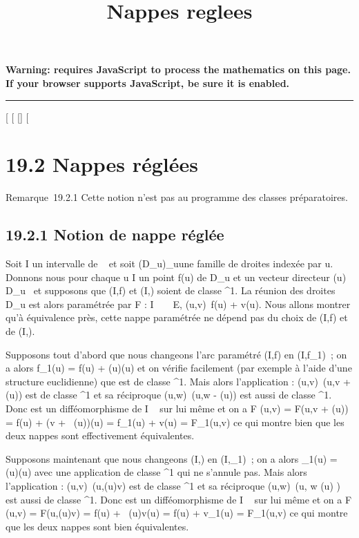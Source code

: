 \documentclass[]{article}
\title{Nappes reglees}
\author{}
\date{}
\begin{document}
\maketitle

\textbf{Warning: 
requires JavaScript to process the mathematics on this page.\\ If your
browser supports JavaScript, be sure it is enabled.}

\begin{center}\rule{3in}{0.4pt}\end{center}

[
[
[]
[

\section{19.2 Nappes réglées}

Remarque~19.2.1 Cette notion n'est pas au programme des classes
préparatoires.

\subsection{19.2.1 Notion de nappe réglée}

Soit I un intervalle de ~ et soit (D_u)_u\inI une
famille de droites indexée par u. Donnons nous pour chaque u \in I un
point f(u) de D_u et un vecteur directeur
\vecg(u) \in\overrightarrow
D_u \diagdown\0\ et supposons que
(I,f) et (I,\vecg) soient de classe ^1.
La réunion des droites D_u est alors paramétrée par F : I \times {}~ \rightarrow~
E, (u,v)\mapsto~f(u) + v\vecg(u).
Nous allons montrer qu'à équivalence près, cette nappe paramétrée ne
dépend pas du choix de (I,f) et de (I,\vecg).

Supposons tout d'abord que nous changeons l'arc paramétré (I,f) en
(I,f_1)~; on a alors f_1(u) = f(u) +
\phi(u)\vecg(u) et on vérifie facilement (par exemple à
l'aide d'une structure euclidienne) que \phi est de classe ^1.
Mais alors l'application \theta : (u,v)\mapsto~(u,v +
\phi(u)) est de classe ^1 et sa réciproque
(u,w)\mapsto~(u,w - \phi(u)) est aussi de classe
^1. Donc \theta est un difféomorphisme de I \times {}~ sur lui même et
on a F \cdot \theta(u,v) = F(u,v + \phi(u)) = f(u) + (v +
\alpha~(u))\vecg(u) = f_1(u) +
v\vecg(u) = F_1(u,v) ce qui montre bien que
les deux nappes sont effectivement équivalentes.

Supposons maintenant que nous changeons (I,\vecg) en
(I,\vecg_1)~; on a alors
\vecg_1(u) = \psi(u)\vecg(u)
avec une application \psi de classe ^1 qui ne s'annule pas.
Mais alors l'application \theta : (u,v)\mapsto~(u,\psi(u)v)
est de classe ^1 et sa réciproque
(u,w)\mapsto~(u, w \over \psi(u) )
est aussi de classe ^1. Donc \theta est un difféomorphisme de I \times
{}~ sur lui même et on a F \cdot \theta(u,v) = F(u,\psi(u)v) = f(u) +
\beta~(u)v\vecg(u) = f(u) +
v\vecg_1(u) = F_1(u,v) ce qui
montre que les deux nappes sont bien équivalentes.
\end{document}
